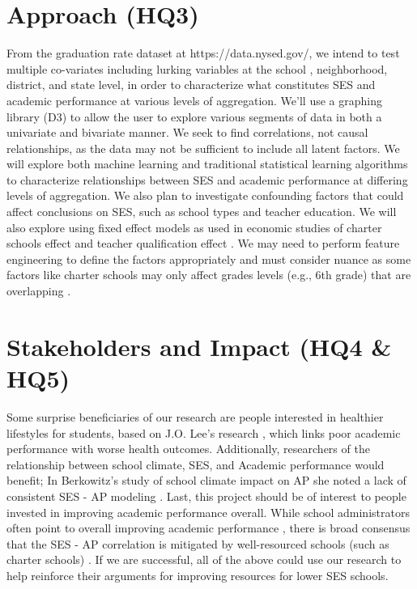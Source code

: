 \documentclass[sigconf,nonacm,11pt]{acmart}
\begin{document}
\section{Approach (HQ3)}
From the graduation rate dataset at https://data.nysed.gov/, we intend to test multiple co-variates including lurking variables at the school \cite{parentalinvolvement}, neighborhood, district, and state level, in order to characterize what constitutes SES and academic performance at various levels of aggregation. We'll use a graphing library (D3) to allow the user to explore various segments of data in both a univariate and bivariate manner. We seek to find correlations, not causal relationships, as the data may not be sufficient to include all latent factors. We will explore both machine learning and traditional statistical learning algorithms to characterize relationships between SES and academic performance at differing levels of aggregation. We also plan to investigate confounding factors that could affect conclusions on SES, such as school types and teacher education. We will also explore using fixed effect models as used in economic studies of charter schools effect \cite{winters, jinnai} and teacher qualification effect \cite{harris}. We may need to perform feature engineering to define the factors appropriately and must consider nuance as some factors like charter schools may only affect grades levels (e.g., 6th grade) that are overlapping \cite{jinnai}.

\section{Stakeholders and Impact (HQ4 \& HQ5)}
Some surprise beneficiaries of our research are people interested in healthier lifestyles for students, based on J.O. Lee's research \cite{lee}, which links poor academic performance with worse health outcomes. Additionally, researchers of the relationship between school climate, SES, and Academic performance would benefit; In Berkowitz's study of school climate impact on AP she noted a lack of consistent SES - AP modeling \cite{berkowitz}. Last, this project should be of interest to people invested in improving academic performance overall. While school administrators often point to overall improving academic performance \cite{domanico}, there is broad consensus that the SES - AP correlation is mitigated by well-resourced schools (such as charter schools) \cite{domanico, jinnai}. If we are successful, all of the above could use our research to help reinforce their arguments for improving resources for lower SES schools.
\end{document}
